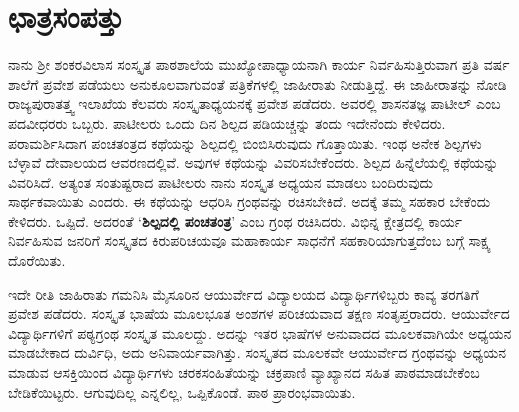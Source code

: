 {\section*{ಛಾತ್ರಸಂಪತ್ತು}

ನಾನು ಶ್ರೀ ಶಂಕರವಿಲಾಸ ಸಂಸ್ಕೃತ ಪಾಠಶಾಲೆಯ ಮುಖ್ಯೋಪಾಧ್ಯಾಯನಾಗಿ ಕಾರ್ಯ ನಿರ್ವಹಿಸುತ್ತಿರುವಾಗ ಪ್ರತಿ ವರ್ಷ ಶಾಲೆಗೆ ಪ್ರವೇಶ ಪಡೆಯಲು ಅನುಕೂಲವಾಗುವಂತೆ ಪತ್ರಿಕೆಗಳಲ್ಲಿ ಜಾಹೀರಾತು ನೀಡುತ್ತಿದ್ದೆ.  ಈ ಜಾಹೀರಾತನ್ನು ನೋಡಿ ರಾಜ್ಯಪುರಾತತ್ತ್ವ ಇಲಾಖೆಯ ಕೆಲವರು ಸಂಸ್ಕೃತಾಧ್ಯಯನಕ್ಕೆ ಪ್ರವೇಶ ಪಡೆದರು.  ಅವರಲ್ಲಿ ಶಾಸನತಜ್ಞ ಪಾಟೀಲ್ ಎಂಬ ಪದವೀಧರರು ಒಬ್ಬರು.  ಪಾಟೀಲರು ಒಂದು ದಿನ ಶಿಲ್ಪದ ಪಡಿಯಚ್ಚನ್ನು ತಂದು ಇದೇನೆಂದು ಕೇಳಿದರು.  ಪರಾಮರ್ಶಿಸಿದಾಗ ಪಂಚತಂತ್ರದ ಕಥೆಯನ್ನು ಶಿಲ್ಪದಲ್ಲಿ ಬಿಂಬಿಸಿರುವುದು ಗೊತ್ತಾಯಿತು.  ಇಂಥ ಅನೇಕ ಶಿಲ್ಪಗಳು ಬೆಳ್ಳಾವೆ ದೇವಾಲಯದ ಆವರಣದಲ್ಲಿವೆ.  ಅವುಗಳ ಕಥೆಯನ್ನು ವಿವರಿಸಬೇಕೆಂದರು.  ಶಿಲ್ಪದ ಹಿನ್ನೆಲೆಯಲ್ಲಿ ಕಥೆಯನ್ನು ವಿವರಿಸಿದೆ.  ಅತ್ಯಂತ ಸಂತುಷ್ಟರಾದ ಪಾಟೀಲರು ನಾನು ಸಂಸ್ಕೃತ ಅಧ್ಯಯನ ಮಾಡಲು ಬಂದಿರುವುದು ಸಾರ್ಥಕವಾಯಿತು ಎಂದರು.  ಈ ಕಥೆಯನ್ನು ಆಧರಿಸಿ ಗ್ರಂಥವನ್ನು ರಚಿಸಬೇಕಿದೆ.  ಅದಕ್ಕೆ  ತಮ್ಮ ಸಹಕಾರ ಬೇಕೆಂದು ಕೇಳಿದರು. ಒಪ್ಪಿದೆ.  ಅದರಂತೆ  ‘\textbf{ಶಿಲ್ಪದಲ್ಲಿ ಪಂಚತಂತ್ರ}’ ಎಂಬ ಗ್ರಂಥ ರಚಿಸಿದರು. ವಿಭಿನ್ನ ಕ್ಷೇತ್ರದಲ್ಲಿ ಕಾರ್ಯ ನಿರ್ವಹಿಸುವ ಜನರಿಗೆ ಸಂಸ್ಕೃತದ ಕಿರುಪರಿಚಯವೂ ಮಹಾಕಾರ್ಯ ಸಾಧನೆಗೆ ಸಹಕಾರಿಯಾಗುತ್ತದೆಂಬ ಬಗ್ಗೆ ಸಾಕ್ಷ್ಯ ದೊರೆಯಿತು.  

ಇದೇ ರೀತಿ ಜಾಹಿರಾತು ಗಮನಿಸಿ ಮೈಸೂರಿನ ಆಯುರ್ವೇದ ವಿದ್ಯಾಲಯದ ವಿದ್ಯಾರ್ಥಿಗಳಿಬ್ಬರು ಕಾವ್ಯ ತರಗತಿಗೆ ಪ್ರವೇಶ ಪಡೆದರು.  ಸಂಸ್ಕೃತ ಭಾಷೆಯ ಮೂಲಭೂತ ಅಂಶಗಳ ಪರಿಚಯವಾದ ತಕ್ಷಣ ಸಂತೃಪ್ತರಾದರು.  ಆಯುರ್ವೇದ ವಿದ್ಯಾರ್ಥಿಗಳಿಗೆ ಪಠ್ಯಗ್ರಂಥ ಸಂಸ್ಕೃತ ಮೂಲದ್ದು.   ಅದನ್ನು ಇತರ ಭಾಷೆಗಳ ಅನುವಾದದ ಮೂಲಕವಾಗಿಯೇ ಅಧ್ಯಯನ ಮಾಡಬೇಕಾದ ದುರ್ವಿಧಿ, ಅದು ಅನಿವಾರ್ಯವಾಗಿತ್ತು. ಸಂಸ್ಕೃತದ ಮೂಲಕವೇ ಆಯುರ್ವೇದ ಗ್ರಂಥವನ್ನು ಅಧ್ಯಯನ ಮಾಡುವ ಆಸಕ್ತಿಯಿಂದ ವಿದ್ಯಾರ್ಥಿಗಳು ಚರಕಸಂಹಿತೆಯನ್ನು ಚಕ್ರಪಾಣಿ ವ್ಯಾಖ್ಯಾನದ ಸಹಿತ ಪಾಠಮಾಡಬೇಕೆಂಬ ಬೇಡಿಕೆಯಿಟ್ಟರು. ಆಗುವುದಿಲ್ಲ ಎನ್ನಲಿಲ್ಲ,  ಒಪ್ಪಿಕೊಂಡೆ.  ಪಾಠ ಪ್ರಾರಂಭವಾಯಿತು.

}
